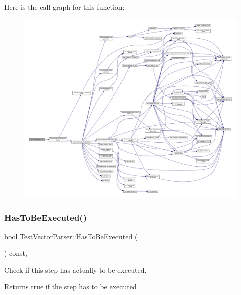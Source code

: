 Here is the call graph for this function\+:
\nopagebreak
\begin{figure}[H]
\begin{center}
\leavevmode
\includegraphics[width=350pt]{d8/d4e/classTestVectorParser_a88660488c77a6d59a68893a4e74cf662_cgraph}
\end{center}
\end{figure}
\mbox{\label{classTestVectorParser_aed4c7043035bd2cb2f0e9ebf32efd66f}} 
\subsubsection{\texorpdfstring{Has\+To\+Be\+Executed()}{HasToBeExecuted()}}
{\footnotesize\ttfamily bool Test\+Vector\+Parser\+::\+Has\+To\+Be\+Executed (\begin{DoxyParamCaption}{ }\end{DoxyParamCaption}) const\hspace{0.3cm}{\ttfamily [override]}, {\ttfamily [virtual]}}



Check if this step has actually to be executed. 

\begin{DoxyReturn}{Returns}
true if the step has to be executed 
\end{DoxyReturn}


